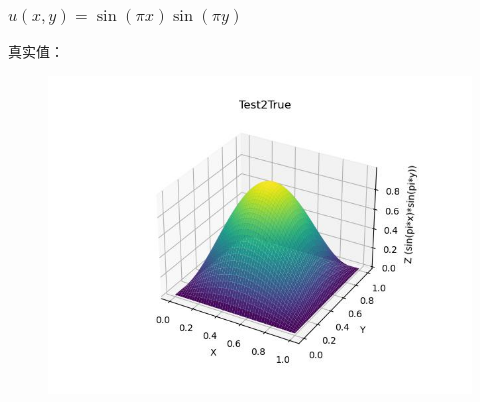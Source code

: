 \documentclass{article}
\begin{document}
\subsubsection{$u(x,y)=\sin(\pi x)\sin(\pi y)$}
真实值：
\begin{figure}[h]
    \centering
    \includegraphics[width=0.7\linewidth]{Test2True.jpg}
\end{figure}
\end{document}
